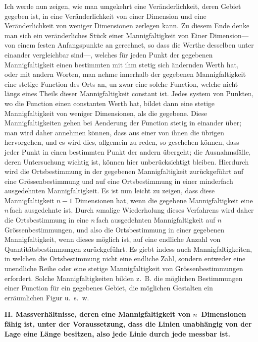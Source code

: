 \documentclass[a4paper,12pt]{article}
\begin{document}
Ich werde nun zeigen, wie man umgekehrt eine
Ver\"{a}nderlichkeit, deren Gebiet gegeben ist, in eine
Ver\"{a}nderlichkeit von einer Dimension und eine
Ver\"{a}nderlichkeit von weniger Dimensionen zerlegen kann.  Zu
diesem Ende denke man sich ein ver\"{a}nderliches St\"{u}ck einer
Mannigfaltigkeit von Einer Dimension---von einem festen
Anfangspunkte an gerechnet, so dass die Werthe desselben unter
einander vergleichbar sind---, welches f\"{u}r jeden Punkt der
gegebenen Mannigfaltigkeit einen bestimmten mit ihm stetig sich
\"{a}ndernden Werth hat, oder mit andern Worten, man nehme
innerhalb der gegebenen Mannigfaltigkeit eine stetige Function
des Orts an, un zwar eine solche Function, welche nicht l\"{a}ngs
eines Theils dieser Mannigfaltigkeit constant ist.  Jedes system
von Punkten, wo die Function einen constanten Werth hat, bildet
dann eine stetige Mannigfaltigkeit von weniger Dimensionen, als
die gegebene.  Diese Mannigfaltigkeiten gehen bei Aenderung der
Function stetig in einander \"{u}ber; man wird daher annehmen
k\"{o}nnen, dass aus einer von ihnen die \"{u}brigen hervorgehen,
und es wird dies, allgemein zu reden, so geschehen k\"{o}nnen,
dass jeder Punkt in einen bestimmten Punkt der andern
\"{u}bergeht; die Ausnahmsf\"{a}lle, deren Untersuchung wichtig
ist, k\"{o}nnen hier unber\"{u}cksichtigt bleiben.  Hierdurch
wird die Ortsbestimmung in der gegebenen Mannigfaltigkeit
zur\"{u}ckgef\"{u}hrt auf eine Gr\"{o}ssenbestimmung und auf eine
Ortsbestimmung in einer minderfach ausgedehnten Mannigfaltigkeit.
Es ist nun leicht zu zeigen, dass diese Mannigfaltigkeit $n - 1$
Dimensionen hat, wenn die gegebene Mannigfaltigkeit eine $n \,$\-fach
ausgedehnte ist.  Durch $n$\-malige Wiederholung dieses
Verfahrens wird daher die Ortsbestimmung in eine $n \,$\-fach
ausgedehnten Mannigfaltigkeit auf $n$ Gr\"{o}ssenbestimmungen,
und also die Ortsbestimmung in einer gegebenen Mannigfaltigkeit,
wenn dieses m\"{o}glich ist, auf eine endliche Anzahl von
Quantit\"{a}tsbestimmungen zur\"{u}ckgef\"{u}hrt.  Es giebt
indess auch Mannigfaltigkeiten, in welchen die Ortsbestimmung
nicht eine endliche Zahl, sondern entweder eine unendliche Reihe
oder eine stetige Mannigfaltigkeit von Gr\"{o}ssenbestimmungen
erfordert.  Solche Mannigfaltigkeiten bilden z.~B. die
m\"{o}glichen Bestimmungen einer Function f\"{u}r ein gegebenes
Gebiet, die m\"{o}glichen Gestalten ein err\"{a}umlichen Figur
u.~s.~w.

\begin{center}
\large\bfseries
II.  Massverh\"{a}ltnisse, deren eine Mannigfaltigkeit von
$n$~Dimensionen f\"{a}hig ist, unter der Voraussetzung, dass die
Linien unabh\"{a}ngig von der Lage eine L\"{a}nge besitzen, also jede
Linie durch jede messbar ist.
\end{center}
\end{document}
